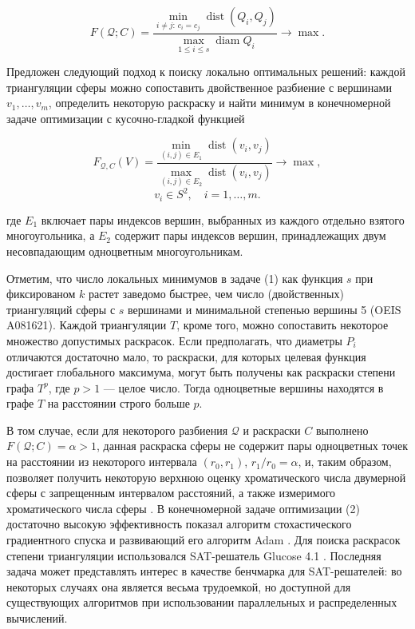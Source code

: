 \begin{equation}
    F(\mathcal{Q}; C) = \frac{\min_{i \neq j:\, c_i = c_j} \operatorname{dist}(Q_i,Q_j)}{\max_{1 \leq i \leq s} \operatorname{diam} Q_i} \rightarrow \operatorname{max}.
\end{equation}

Предложен следующий подход к поиску локально оптимальных решений:  каждой триангуляции сферы   можно сопоставить двойственное разбиение с вершинами $v_1, \dots , v_m$, определить некоторую раскраску и найти минимум в конечномерной задаче оптимизации с кусочно-гладкой функцией

\begin{equation}
    F_{\mathcal{Q},C}(V) = \frac{\min_{(i, j) \in E_1} \operatorname{dist}(v_i,v_j)}{\max_{(i,j) \in E_2} \operatorname{dist}(v_i,v_j)} \rightarrow \operatorname{max},     
\end{equation}
\[
    v_i \in S^2, \quad i=1, \dots, m.
\]

\noindent где $E_1$ включает пары индексов вершин, выбранных из каждого отдельно взятого многоугольника, а $E_2$ содержит пары индексов вершин, принадлежащих двум несовпадающим одноцветным многоугольникам. 

Отметим, что число локальных минимумов в задаче (1) как функция $s$ при фиксированом $k$ растет заведомо быстрее, чем число (двойственных) триангуляций сферы с $s$ вершинами и минимальной степенью вершины 5 (OEIS A081621). Каждой триангуляции $T$, кроме того, можно сопоставить некоторое множество допустимых раскрасок. Если предполагать, что диаметры $P_i$ отличаются достаточно мало, то раскраски, для которых целевая функция достигает глобального максимума, могут быть получены как раскраски степени графа $T^p$, где  $p>1$ --- целое число.  Тогда  одноцветные вершины находятся в графе $T$ на расстоянии строго больше $p$. 

В том случае, если для некоторого разбиения $\mathcal{Q}$ и раскраски $C$ выполнено $F(\mathcal{Q}; C) = \alpha>1$, данная раскраска сферы не содержит пары одноцветных точек на расстоянии из некоторого интервала $(r_0, r_1)$, $r_1/r_0 = \alpha$, и, таким образом, позволяет получить некоторую верхнюю оценку хроматического числа двумерной сферы с запрещенным интервалом расстояний, а также измеримого хроматического числа сферы \cite{Simmons, Malen, Sirgedas}. В конечномерной задаче оптимизации (2) достаточно высокую эффективность показал алгоритм стохастического градиентного спуска и развивающий его алгоритм Adam \cite{Adam}. Для поиска раскрасок степени триангуляции использовался SAT-решатель Glucose 4.1 \cite{Glucose}. Последняя задача может представлять интерес в качестве бенчмарка для SAT-решателей: во некоторых случаях она является весьма трудоемкой, но доступной для существующих алгоритмов при использовании параллельных и распределенных вычислений. 


